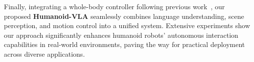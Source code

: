 Finally, integrating a whole-body controller following previous work~\cite{he2024learning}, our proposed \textbf{Humanoid-VLA} seamlessly combines language understanding, scene perception, and motion control into a unified system. 
Extensive experiments show our approach significantly enhances humanoid robots' autonomous interaction capabilities in real-world environments, paving the way for practical deployment across diverse applications.









